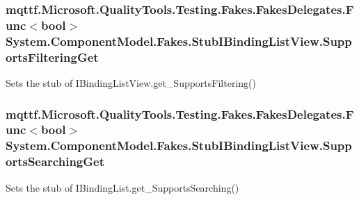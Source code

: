 \hypertarget{class_system_1_1_component_model_1_1_fakes_1_1_stub_i_binding_list_view_a507f1138be69e518891ac4c4a6c170db}{
\subsubsection[{Supports\-Filtering\-Get}]{\setlength{\rightskip}{0pt plus 5cm}mqttf.\-Microsoft.\-Quality\-Tools.\-Testing.\-Fakes.\-Fakes\-Delegates.\-Func$<$bool$>$ System.\-Component\-Model.\-Fakes.\-Stub\-I\-Binding\-List\-View.\-Supports\-Filtering\-Get}}\label{class_system_1_1_component_model_1_1_fakes_1_1_stub_i_binding_list_view_a507f1138be69e518891ac4c4a6c170db}


Sets the stub of I\-Binding\-List\-View.\-get\-\_\-\-Supports\-Filtering()

\hypertarget{class_system_1_1_component_model_1_1_fakes_1_1_stub_i_binding_list_view_a05228aca6f18727251468e27bbcb3a1f}{
\subsubsection[{Supports\-Searching\-Get}]{\setlength{\rightskip}{0pt plus 5cm}mqttf.\-Microsoft.\-Quality\-Tools.\-Testing.\-Fakes.\-Fakes\-Delegates.\-Func$<$bool$>$ System.\-Component\-Model.\-Fakes.\-Stub\-I\-Binding\-List\-View.\-Supports\-Searching\-Get}}\label{class_system_1_1_component_model_1_1_fakes_1_1_stub_i_binding_list_view_a05228aca6f18727251468e27bbcb3a1f}


Sets the stub of I\-Binding\-List.\-get\-\_\-\-Supports\-Searching()

